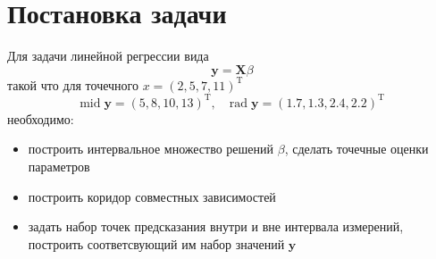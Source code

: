 \section{Постановка задачи}
Для задачи линейной регрессии вида
\begin{equation} \label{Task}
    \mathbf{y}=\mathbf{X}\beta
\end{equation}
такой что для точечного $x=(2,5,7,11)^\mathrm{T}$
\begin{equation}
    \mathrm{mid}\;\mathbf{y}=(5, 8, 10, 13)^\mathrm{T},
\quad
    \mathrm{rad}\;\mathbf{y}=(1.7, 1.3, 2.4, 2.2)^\mathrm{T}
\end{equation}
необходимо:
\begin{itemize}
    \item построить интервальное множество решений $\beta$, сделать точечные оценки параметров
    \item построить коридор совместных зависимостей
    \item задать набор точек предсказания внутри и вне интервала измерений, построить соответсвующий им набор значений $\mathbf{y}$
\end{itemize}